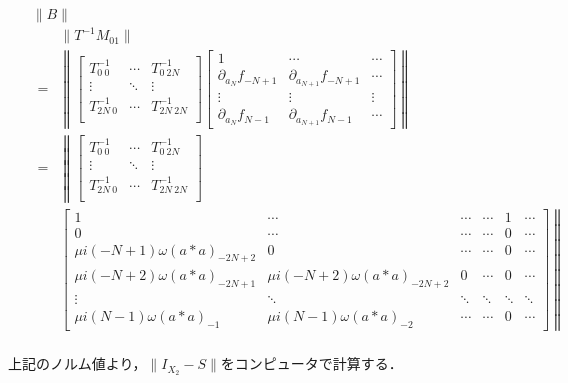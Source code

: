 \begin{enumerate}
\item[$\|B\|$]
\begin{equation}
  \begin{split}
    &\|T^{-1}M_{01}\| \\
    =& \left \| \begin{bmatrix}
      T^{-1}_{0\ 0} & \cdots & T^{-1}_{0\ 2N} \\
      \vdots & \ddots & \vdots \\
      T^{-1}_{2N\ 0} & \cdots & T^{-1}_{2N\ 2N} \\
    \end{bmatrix}
    \begin{bmatrix}
      1 & \cdots & \cdots \\
      \partial_{a_N} f_{-N+1} & \partial_{a_{N+1}} f_{-N+1}  & \cdots \\
      \vdots & \vdots & \vdots \\
      \partial_{a_N} f_{N-1} & \partial_{a_{N+1}} f_{N-1}  & \cdots
    \end{bmatrix}\right\| \\
    =& \left\| \begin{bmatrix}
      T^{-1}_{0\ 0} & \cdots & T^{-1}_{0\ 2N} \\
      \vdots & \ddots & \vdots \\
      T^{-1}_{2N\ 0} & \cdots & T^{-1}_{2N\ 2N} \\
    \end{bmatrix}\right.\\
    &\left. \begin{bmatrix}
      1 & \cdots & \cdots  & \cdots & 1 & \cdots \\
      0 & \cdots & \cdots  & \cdots & 0 & \cdots \\
      \mu i (-N+1) \omega (a*a)_{-2N+2} & 0 & \cdots  & \cdots & 0 & \cdots\\
      \mu i (-N+2) \omega (a*a)_{-2N+1} & \mu i (-N+2) \omega (a*a)_{-2N+2} & 0 & \cdots & 0 & \cdots \\
      \vdots & \ddots & \ddots & \ddots & \ddots & \ddots \\
      \mu i (N-1) \omega (a*a)_{-1} & \mu i (N-1) \omega (a*a)_{-2}  & \cdots & \cdots & 0 & \cdots
    \end{bmatrix}\right\|\\
  \end{split}
\end{equation}
\end{enumerate}

上記のノルム値より，$\|I_{X_2} - S\|$をコンピュータで計算する．


